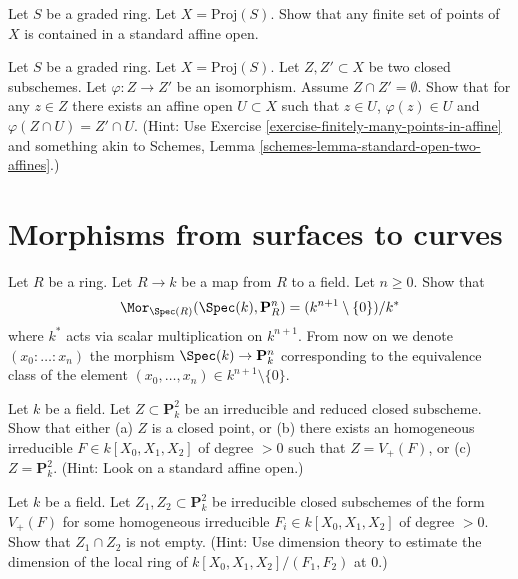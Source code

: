 \begin{exercise}
\label{exercise-finitely-many-points-in-affine}
Let $S$ be a graded ring.
Let $X = \text{Proj}(S)$.
Show that any finite set of points of $X$ is contained in a standard
affine open.
\end{exercise}

\begin{exercise}
\label{exercise-prepare-glueing}
Let $S$ be a graded ring.
Let $X = \text{Proj}(S)$.
Let $Z, Z' \subset X$ be two closed subschemes.
Let $\varphi : Z \to Z'$ be an isomorphism.
Assume $Z \cap Z' = \emptyset$.
Show that for any $z \in Z$ there exists an affine
open $U \subset X$ such that $z \in U$, $\varphi(z) \in U$ and
$\varphi(Z \cap U) = Z' \cap U$.
(Hint: Use Exercise \ref{exercise-finitely-many-points-in-affine}
and something akin to
Schemes, Lemma \ref{schemes-lemma-standard-open-two-affines}.)
\end{exercise}










\section{Morphisms from surfaces to curves}
\label{section-from-surfaces-to-curves}

\begin{exercise}
\label{exercise-points-projective-space}
Let $R$ be a ring.
Let $R \to k$ be a map from $R$ to a field.
Let $n \geq 0$.
Show that
$$
\Mor_{\Spec(R)}(\Spec(k), \mathbf{P}^n_R)
=
(k^{n + 1} \setminus \{0\})/k^*
$$
where $k^*$ acts via scalar multiplication on $k^{n + 1}$.
From now on we denote $(x_0 : \ldots : x_n)$ the
morphism $\Spec(k) \to \mathbf{P}^n_k$ corresponding
to the equivalence class of the element
$(x_0, \ldots, x_n) \in k^{n + 1} \setminus \{0\}$.
\end{exercise}

\begin{exercise}
\label{exercise-curve-projective-plane}
Let $k$ be a field. Let $Z \subset \mathbf{P}^2_k$ be an
irreducible and reduced closed subscheme.
Show that either (a) $Z$ is a closed point, or (b) there exists
an homogeneous irreducible $F \in k[X_0, X_1, X_2]$ of degree $> 0$
such that $Z = V_{+}(F)$, or (c) $Z = \mathbf{P}^2_k$.
(Hint: Look on a standard affine open.)
\end{exercise}

\begin{exercise}
\label{exercise-bezout}
Let $k$ be a field. Let $Z_1, Z_2 \subset \mathbf{P}^2_k$ be
irreducible closed subschemes of the form $V_{+}(F)$
for some homogeneous irreducible $F_i \in k[X_0, X_1, X_2]$ of degree $> 0$.
Show that $Z_1 \cap Z_2$ is not empty.
(Hint: Use dimension theory to estimate the dimension of
the local ring of $k[X_0, X_1, X_2]/(F_1, F_2)$ at $0$.)
\end{exercise}

